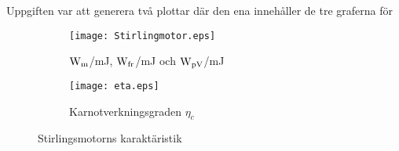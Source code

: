 \documentclass[11pt,a4paper]{article}
\begin{document}
Uppgiften var att generera två plottar där den ena innehåller de tre
graferna för 
\begin{figure}[h]
\centering
\begin{subfigure}{0.45\textwidth}
    \texttt{[image: Stirlingmotor.eps]}
    \caption{ $\rm{W_m}$/mJ, $\rm{W_{fr}}$/mJ och $\rm{W_{pV}}$/mJ}
    \label{fig:first}
\end{subfigure}
\begin{subfigure}{0.45\textwidth}
    \texttt{[image: eta.eps]}
    \caption{Karnotverkningsgraden $\eta_c$}
    \label{fig:second}
\end{subfigure}

\caption{Stirlingsmotorns karaktäristik}
\label{fig:fig2}
\end{figure}
\end{document}
